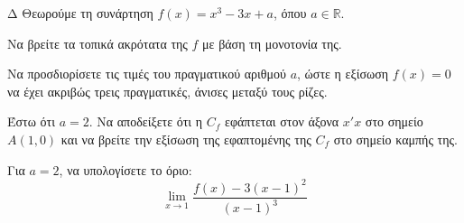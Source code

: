 \begin{thema}{Δ}
Θεωρούμε τη συνάρτηση $f(x) = x^3 - 3x + a$, όπου $a \in \mathbb{R}$.
\begin{erwthma}
    \item Να βρείτε τα τοπικά ακρότατα της $f$ με βάση τη μονοτονία της.
    \item Να προσδιορίσετε τις τιμές του πραγματικού αριθμού $a$, ώστε η εξίσωση $f(x) = 0$ να έχει ακριβώς τρεις πραγματικές, άνισες μεταξύ τους ρίζες.
    \item Έστω ότι $a=2$. Να αποδείξετε ότι η $C_f$ εφάπτεται στον άξονα $x'x$ στο σημείο $A(1,0)$ και να βρείτε την εξίσωση της εφαπτομένης της $C_f$ στο σημείο καμπής της.
    \item Για $a=2$, να υπολογίσετε το όριο:
    \[ \lim_{x \to 1} \frac{f(x)-3(x-1)^2}{(x-1)^3} \]
\end{erwthma}
\end{thema}
